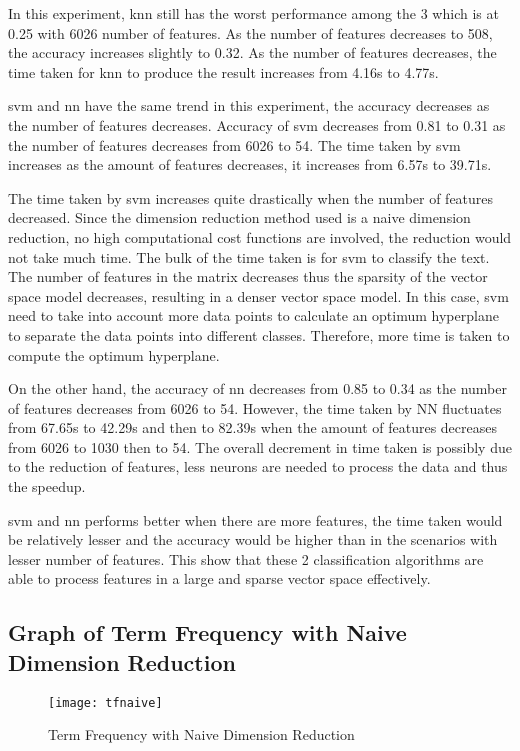 In this experiment, \ac{knn} still has the worst performance among the 3 which is at 0.25 with 6026 number of features. As the number of features decreases to 508, the accuracy increases slightly to 0.32. As the number of features decreases, the time taken for \ac{knn} to produce the result increases from 4.16s to 4.77s.

\Ac{svm} and \ac{nn} have the same trend in this experiment, the accuracy decreases as the number of features decreases. Accuracy of \ac{svm} decreases from 0.81 to 0.31 as the number of features decreases from 6026 to 54. The time taken by \ac{svm} increases as the amount of features decreases, it increases from 6.57s to 39.71s.

The time taken by \ac{svm} increases quite drastically when the number of features decreased. Since the dimension reduction method used is a naive dimension reduction, no high computational cost functions are involved, the reduction would not take much time. The bulk of the time taken is for \ac{svm} to classify the text. The number of features in the matrix decreases thus the sparsity of the vector space model decreases, resulting in a denser vector space model. In this case, \ac{svm} need to take into account more data points to calculate an optimum hyperplane to separate the data points into different classes. Therefore, more time is taken to compute the optimum hyperplane.

On the other hand, the accuracy of \ac{nn} decreases from 0.85 to 0.34 as the number of features decreases from 6026 to 54. However, the time taken by NN fluctuates from 67.65s to 42.29s and then to 82.39s when the amount of features decreases from 6026 to 1030 then to 54. The overall decrement in time taken is possibly due to the reduction of features, less neurons are needed to process the data and thus the speedup.

\Ac{svm} and \ac{nn} performs better when there are more features, the time taken would be relatively lesser and the accuracy would be higher than in the scenarios with lesser number of features. This show that these 2 classification algorithms are able to process features in a large and sparse vector space effectively.\\

\subsection{Graph of Term Frequency with Naive Dimension Reduction}
\begin{figure} [H]
	\centering
	\texttt{[image: tfnaive]}
	\caption{Term Frequency with Naive Dimension Reduction}
	\label{fig:tfnaive}
\end{figure}

